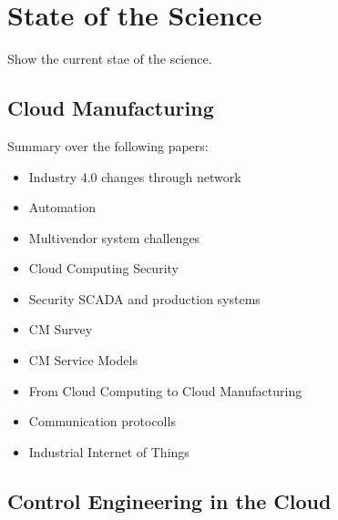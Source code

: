 \documentclass[
a4paper,
twoside,
bibliography=totoc,
headsepline,
cleardoublepage=empty,
parskip=half,
draft=false
]{scrbook}
\begin{document}
	\chapter{State of the Science} \label{ch:state_of_the_Science}
	
		Show the current stae of the science.
		
		\section{Cloud Manufacturing}\label{sec:industry_4}
		
			Summary over the following papers:
			
			\begin{itemize}
				
				\item Industry 4.0 changes through network~\cite{brettel2014virtualization}
				
				\item Automation~\cite{jazdi2014cyber}
				
				\item Multivendor system challenges~\cite{weyer2015towards}
				
				\item Cloud Computing Security~\cite{subashini2011survey}
				
				\item Security SCADA and production systems~\cite{igure2006security}
				
				\item CM Survey~\cite{he2015state}
				
				\item CM Service Models~\cite{li2010cloud}
				
				\item From Cloud Computing to Cloud Manufacturing~\cite{xu2012cloud}
				
				\item Communication protocolls~\cite{wollschlaeger2017future}
				
				\item Industrial Internet of Things~\cite{jeschke2017industrial}
				
			\end{itemize}
		
		\section{Control Engineering in the Cloud}\label{sec:control_engineering_in_the_cloud}
		
\end{document}
